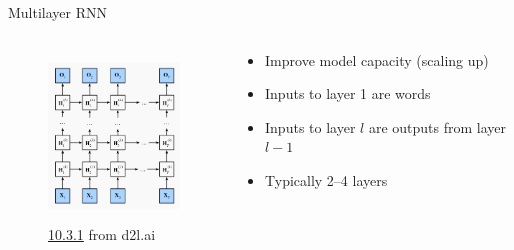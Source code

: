 \documentclass[usenames,dvipsnames,notes,11pt,aspectratio=169,hyperref={colorlinks=true, linkcolor=blue}]{beamer}
\begin{document}
\begin{frame}
    {Multilayer RNN}
    \begin{columns}
        \begin{column}{0.5\textwidth}
    \begin{figure}
        \includegraphics[height=4.5cm]{figures/multi-rnn}
        \caption{\href{https://d2l.ai/chapter_recurrent-modern/deep-rnn.html}{10.3.1} from {d2l.ai}}
    \end{figure}
        \end{column}
        \begin{column}{0.5\textwidth}
            \begin{itemize}
                \item Improve model capacity (scaling up) 
                \item Inputs to layer 1 are words
                \item Inputs to layer $l$ are outputs from layer $l-1$
                \item Typically 2--4 layers
            \end{itemize}
        \end{column}
    \end{columns}
\end{frame}
\end{document}
